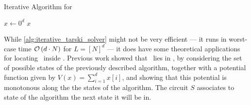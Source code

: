 \begin{algorithm}
    \caption{Iterative Algorithm for \Tarski}
    \label{alg:iterative_tarski_solver}
    $x \leftarrow 0^d$ \;
    \Return $x$ \;
\end{algorithm}

While \cref{alg:iterative_tarski_solver} might not be very efficient --- it runs in worst-case time $\mathcal{O}\left(d \cdot N\right)$ for $L = [N]^d$ --- it does have some theoretical applications for locating \Tarski\ inside \TFNP. Previous work  showed that \Tarski\ lies in \PLS, by considering the set of possible states of the previously described algorithm, together with a potential function given by $V(x) = \sum_{i=1}^{d}{x[i]}$, and showing that this potential is monotonous along the the states of the algorithm. The circuit $S$ associates to state of the algorithm the next state it will be in.

